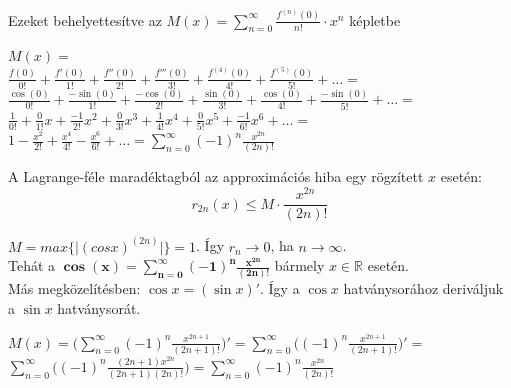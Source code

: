 \documentclass[tikz,12pt,margin=0px]{article}
\newcommand\ddfrac[2]{\frac{\displaystyle #1}{\displaystyle #2}}
\begin{document}
    \noindent Ezeket behelyettesítve az $M(x) = \sum\limits_{n=0}^{\infty}\ddfrac{f^{(n)}(0)}{n!} \cdot x^{n}$ képletbe
    \begin{spacing}{2}
        \begin{center}
            $M(x) = $\\
            $\ddfrac{f(0)}{0!} + \ddfrac{f'(0)}{1!} + \ddfrac{f''(0)}{2!} + \ddfrac{f'''(0)}{3!} + \ddfrac{f^{(4)}(0)}{4!} + \ddfrac{f^{(5)}(0)}{5!} + \ldots =$\\
            $\ddfrac{\cos(0)}{0!} + \ddfrac{-\sin(0)}{1!} + \ddfrac{-\cos(0)}{2!} + \ddfrac{\sin(0)}{3!} + \ddfrac{\cos(0)}{4!} + \ddfrac{-\sin(0)}{5!} + \ldots =$\\
            $\ddfrac{1}{0!} + \ddfrac{0}{1!}x + \ddfrac{-1}{2!}x^{2} + \ddfrac{0}{3!}x^{3} + \ddfrac{1}{4!}x^{4} + \ddfrac{0}{5!}x^{5} + \ddfrac{-1}{6!}x^{6} + \ldots =$ \\
            $1 - \ddfrac{x^2}{2!} + \ddfrac{x^4}{4!} - \ddfrac{x^6}{6!} + \ldots = \sum\limits_{n=0}^{\infty}(-1)^{n}\ddfrac{x^{2n}}{(2n)!}$
        \end{center}
    \end{spacing}

    \noindent A Lagrange-féle maradéktagból az approximációs hiba egy rögzített $x$ esetén:
    \[
        r_{2n}(x) \leq M \cdot \ddfrac{x^{2n}}{(2n)!}
    \]

    \noindent $M = max\Big\{\big|(cos x)^{(2n)}\big|\Big\} = 1$. Így $r_{n} \to 0$, ha $n \to \infty$.\\

    \noindent Tehát a $\boldsymbol{\cos(x) = \sum\limits_{n=0}^{\infty}(-1)^{n}\ddfrac{x^{2n}}{(2n)!}}$ bármely $x \in \mathbb{R}$ esetén.\\

    \noindent Más megközelítésben: $\cos x = (\sin x)'$. Így a $\cos x$ hatványsorához deriváljuk a $\sin x$ hatványsorát.

    \begin{spacing}{2}
        \begin{center}
            $M(x) = \Big(\sum\limits_{n=0}^{\infty}(-1)^{n}\ddfrac{x^{2n+1}}{(2n+1)!}\Big)' = \sum\limits_{n=0}^{\infty}\Big((-1)^{n}\ddfrac{x^{2n+1}}{(2n+1)!}\Big)' = $\\
            $\sum\limits_{n=0}^{\infty}\Big((-1)^{n}\ddfrac{(2n+1)x^{2n}}{(2n+1)(2n)!}\Big) = \sum\limits_{n=0}^{\infty}(-1)^{n}\ddfrac{x^{2n}}{(2n)!}$
        \end{center}
    \end{spacing}
\end{document}
